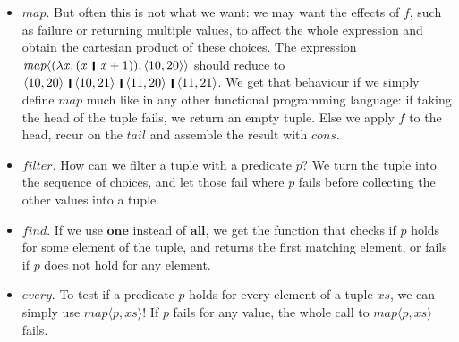 \documentclass[acmsmall,review,dvipsnames]{acmart}
\newcommand{\Varid}[1]{\mathit{#1}}
\begin{document}
\begin{itemize}
\item \ensuremath{\Varid{map}}.
But often this is not what we want: we may want the effects of \ensuremath{\Varid{f}}, such as failure or returning multiple values,
to affect the whole expression and obtain the cartesian product of these choices.
The expression \ensuremath{\Varid{map}\langle(\lambda\Varid{x}.\,(\Varid{x}\hspace{1mm}\mathop{\rule[-0.3mm]{0.5mm}{2.5mm}}\hspace{1mm}\Varid{x}\mathbin{+}\mathrm{1})),\langle{}\mathrm{10},\mathrm{20}\rangle\rangle} should reduce to \ensuremath{\langle{}\mathrm{10},\mathrm{20}\rangle\hspace{1mm}\mathop{\rule[-0.3mm]{0.5mm}{2.5mm}}\hspace{1mm}\langle{}\mathrm{10},\mathrm{21}\rangle\hspace{1mm}\mathop{\rule[-0.3mm]{0.5mm}{2.5mm}}\hspace{1mm}\langle{}\mathrm{11},\mathrm{20}\rangle\hspace{1mm}\mathop{\rule[-0.3mm]{0.5mm}{2.5mm}}\hspace{1mm}\langle{}\mathrm{11},\mathrm{21}\rangle}.
We get that behaviour if we simply define \ensuremath{\Varid{map}} much like in any other functional programming language:
if taking the head of the tuple fails, we return an empty tuple.
Else we apply \ensuremath{\Varid{f}} to the head, recur on the \ensuremath{\Varid{tail}} and assemble the result with \ensuremath{\Varid{cons}}.\label{sec:map}

\item \ensuremath{\Varid{filter}}.
How can we filter a tuple with a predicate \ensuremath{\Varid{p}}?
We turn the tuple into the sequence of choices, and let those fail where \ensuremath{\Varid{p}} fails before collecting the other values into a tuple.

\item \ensuremath{\Varid{find}}.
If we use \ensuremath{\textbf{one}} instead of \ensuremath{\textbf{all}}, we get the function that checks if \ensuremath{\Varid{p}} holds for some element of the tuple,
and returns the first matching element, or fails if \ensuremath{\Varid{p}} does not hold for any element.

\item \ensuremath{\Varid{every}}.
To test if a predicate \ensuremath{\Varid{p}} holds for every element of a tuple \ensuremath{ xs }, we can simply use \ensuremath{\Varid{map}\langle\Varid{p}, xs \rangle}!
If \ensuremath{\Varid{p}} fails for any value, the whole call to \ensuremath{\Varid{map}\langle\Varid{p}, xs \rangle} fails.
\end{itemize}
\end{document}
